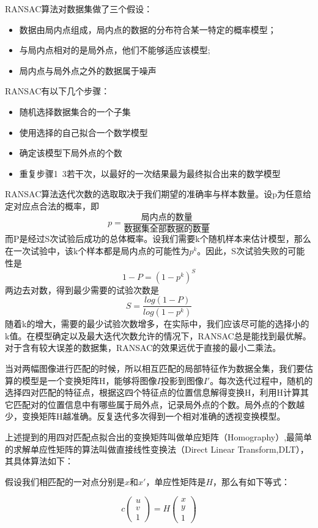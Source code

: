 RANSAC算法对数据集做了三个假设：

\begin{itemize}
\item 数据由局内点组成，局内点的数据的分布符合某一特定的概率模型；
\item 与局内点相对的是局外点，他们不能够适应该模型;
\item 局内点与局外点之外的数据属于噪声
\end{itemize}

RANSAC有以下几个步骤：
\begin{itemize}
\item 随机选择数据集合的一个子集
\item 使用选择的自己拟合一个数学模型
\item 确定该模型下局外点的个数
\item 重复步骤1~3若干次，以最好的一次结果最为最终拟合出来的数学模型
\end{itemize}

RANSAC算法迭代次数的选取取决于我们期望的准确率与样本数量。设p为任意给定对应点合法的概率，即
\[p = \frac{\text{局内点的数量}}{\text{数据集全部数据的数量}}\]
而P是经过S次试验后成功的总体概率。设我们需要k个随机样本来估计模型，那么在一次试验中，该k个样本都是局内点的可能性为\(p^k\)。因此，S次试验失败的可能性是
\[1 - P = (1 - p^k)^S\]
两边去对数，得到最少需要的试验次数是
\[S = \frac{log(1-P)}{log(1-p^k)}\]
随着k的增大，需要的最少试验次数增多，在实际中，我们应该尽可能的选择小的k值。在模型确定以及最大迭代次数允许的情况下，RANSAC总是能找到最优解。对于含有较大误差的数据集，RANSAC的效果远优于直接的最小二乘法。 

当对两幅图像进行匹配的时候，所以相互匹配的局部特征作为数据全集，我们要估算的模型是一个变换矩阵H，能够将图像\(I\)投影到图像\(I'\)。每次迭代过程中，随机的选择四对匹配的特征点，根据这四个特征点的位置信息解得变换H，利用H计算其它匹配对的位置信息中有哪些属于局外点，记录局外点的个数。局外点的个数越少，变换矩阵H越准确。反复迭代多次得到一个相对准确的透视变换模型。

上述提到的用四对匹配点拟合出的变换矩阵叫做单应矩阵（Homography）,最简单的求解单应性矩阵的算法叫做直接线性变换法（Direct Linear Transform,DLT）\cite{Dubrofsky:2009tz}，其具体算法如下：

假设我们相匹配的一对点分别是\(x\)和\(x'\)，单应性矩阵是\(H\)，那么有如下等式：

\begin{equation}
\label{homography1}
	c
	\begin{pmatrix}
	u \\
	v \\
	1
	\end{pmatrix}
	= H
	\begin{pmatrix}
	x \\
	y \\
	1
	\end{pmatrix}
\end{equation}


